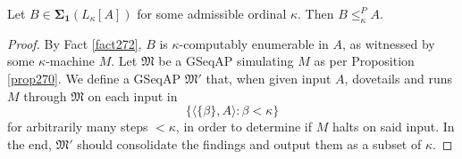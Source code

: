 \documentclass[12pt]{article}
\numberwithin{equation}{section}
\begin{document}
\begin{lem}\label{lem273}
Let $B \in \mathbf{\Sigma_1}(L_{\kappa}[A])$ for some admissible ordinal $\kappa$. Then $B \leq^P_{\kappa} A$.
\end{lem}

\begin{proof}
By Fact \ref{fact272}, $B$ is $\kappa$-computably enumerable in $A$, as witnessed by some $\kappa$-machine $M$. Let $\mathfrak{M}$ be a GSeqAP simulating $M$ as per Proposition \ref{prop270}. We define a GSeqAP $\mathfrak{M}'$ that, when given input $A$, dovetails and runs $M$ through $\mathfrak{M}$ on each input in
\begin{equation*}
    \{\langle \{\beta\}, A \rangle : \beta < \kappa\}
\end{equation*}
for arbitrarily many steps $< \kappa$, in order to determine if $M$ halts on said input. In the end, $\mathfrak{M}'$ should consolidate the findings and output them as a subset of $\kappa$.


\end{proof}
\end{document}
